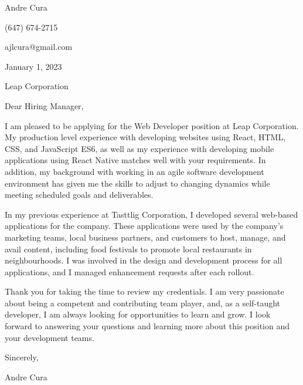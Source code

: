 \documentclass[letterpaper,12pt]{article}
\begin{document}
Andre Cura

(647) 674-2715

ajlcura@gmail.com

\vspace{0.25in}

January 1, 2023

\vspace{0.25in}

Leap Corporation

\vspace{0.5in}

Dear Hiring Manager,

\vspace{0.5in}

I am pleased to be applying for the Web Developer position at Leap Corporation.
My production level experience with developing websites using React, HTML, CSS, and JavaScript ES6,
as well as my experience with developing mobile applications using React Native
matches well with your requirements.
In addition, my background with working in an agile software development environment
has given me the skills to adjust to changing dynamics
while meeting scheduled goals and deliverables.

\vspace{0.25in}

In my previous experience at Tasttlig Corporation,
I developed several web-based applications for the company.
These applications were used by the company's marketing teams,
local business partners, and customers
to host, manage, and avail content, including food festivals
to promote local restaurants in neighbourhoods.
I was involved in the design and development process for all applications,
and I managed enhancement requests after each rollout.

% 

\vspace{0.25in}

Thank you for taking the time to review my credentials.
I am very passionate about being a competent and contributing team player, and,
as a self-taught developer, I am always looking for opportunities to learn and grow.
I look forward to answering your questions and learning more about this position
and your development teams.

\vspace{0.5in}
Sincerely,

Andre Cura
\end{document}
